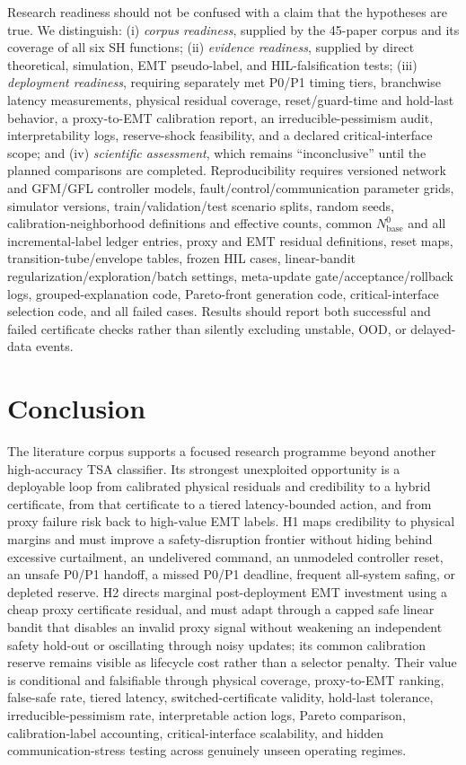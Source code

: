 \documentclass[conference]{IEEEtran}
\begin{document}
Research readiness should not be confused with a claim that the hypotheses are true. We distinguish: (i) \emph{corpus readiness}, supplied by the 45-paper corpus and its coverage of all six SH functions; (ii) \emph{evidence readiness}, supplied by direct theoretical, simulation, EMT pseudo-label, and HIL-falsification tests; (iii) \emph{deployment readiness}, requiring separately met P0/P1 timing tiers, branchwise latency measurements, physical residual coverage, reset/guard-time and hold-last behavior, a proxy-to-EMT calibration report, an irreducible-pessimism audit, interpretability logs, reserve-shock feasibility, and a declared critical-interface scope; and (iv) \emph{scientific assessment}, which remains ``inconclusive'' until the planned comparisons are completed. Reproducibility requires versioned network and GFM/GFL controller models, fault/control/communication parameter grids, simulator versions, train/validation/test scenario splits, random seeds, calibration-neighborhood definitions and effective counts, common $N_{\mathrm{base}}^{0}$ and all incremental-label ledger entries, proxy and EMT residual definitions, reset maps, transition-tube/envelope tables, frozen HIL cases, linear-bandit regularization/exploration/batch settings, meta-update gate/acceptance/rollback logs, grouped-explanation code, Pareto-front generation code, critical-interface selection code, and all failed cases. Results should report both successful and failed certificate checks rather than silently excluding unstable, OOD, or delayed-data events.

\section{Conclusion}

The literature corpus supports a focused research programme beyond another high-accuracy TSA classifier. Its strongest unexploited opportunity is a deployable loop from calibrated physical residuals and credibility to a hybrid certificate, from that certificate to a tiered latency-bounded action, and from proxy failure risk back to high-value EMT labels. H1 maps credibility to physical margins and must improve a safety-disruption frontier without hiding behind excessive curtailment, an undelivered command, an unmodeled controller reset, an unsafe P0/P1 handoff, a missed P0/P1 deadline, frequent all-system safing, or depleted reserve. H2 directs marginal post-deployment EMT investment using a cheap proxy certificate residual, and must adapt through a capped safe linear bandit that disables an invalid proxy signal without weakening an independent safety hold-out or oscillating through noisy updates; its common calibration reserve remains visible as lifecycle cost rather than a selector penalty. Their value is conditional and falsifiable through physical coverage, proxy-to-EMT ranking, false-safe rate, tiered latency, switched-certificate validity, hold-last tolerance, irreducible-pessimism rate, interpretable action logs, Pareto comparison, calibration-label accounting, critical-interface scalability, and hidden communication-stress testing across genuinely unseen operating regimes.
\end{document}
